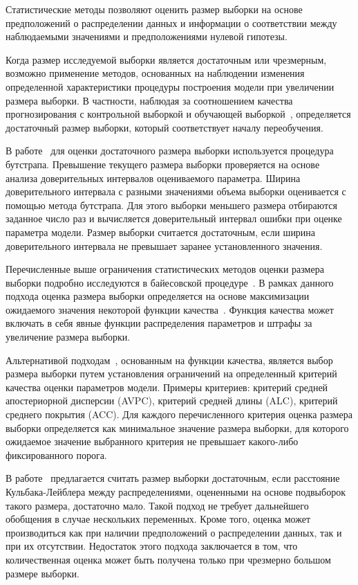 Статистические методы позволяют оценить размер выборки на основе предположений о распределении данных и информации о соответствии между наблюдаемыми значениями и предположениями нулевой гипотезы.

Когда размер исследуемой выборки является достаточным или чрезмерным, возможно применение методов, основанных на наблюдении изменения определенной характеристики процедуры построения модели при увеличении размера выборки. В частности, наблюдая за соотношением качества прогнозирования с контрольной выборкой и обучающей выборкой~\cite{motrenko2014}, определяется достаточный размер выборки, который соответствует началу переобучения.

В работе~\cite{qumsiyeh2013} для оценки достаточного размера выборки используется процедура бутстрапа. Превышение текущего размера выборки проверяется на основе анализа доверительных интервалов оцениваемого параметра. Ширина доверительного интервала с разными значениями объема выборки оценивается с помощью метода бутстрапа. Для этого выборки меньшего размера отбираются заданное число раз и вычисляется доверительный интервал ошибки при оценке параметра модели. Размер выборки считается достаточным, если ширина доверительного интервала не превышает заранее установленного значения.

Перечисленные выше ограничения статистических методов оценки размера выборки подробно исследуются в байесовской процедуре~\cite{lindley1997,rubin1998,wang2002}. В рамках данного подхода оценка размера выборки определяется на основе максимизации ожидаемого значения некоторой функции качества~\cite{lindley1997}. Функция качества может включать в себя явные функции распределения параметров и штрафы за увеличение размера выборки.

Альтернативой подходам~\cite{wang2002}, основанным на функции качества, является выбор размера выборки путем установления ограничений на определенный критерий качества оценки параметров модели. Примеры критериев: критерий средней апостериорной дисперсии (AVPC), критерий средней длины (ALC), критерий среднего покрытия (ACC). Для каждого перечисленного критерия оценка размера выборки определяется как минимальное значение размера выборки, для которого ожидаемое значение выбранного критерия не превышает какого-либо фиксированного порога.

В работе~\cite{motrenko2014} предлагается считать размер выборки достаточным, если расстояние Кульбака-Лейблера между распределениями, оцененными на основе подвыборок такого размера, достаточно мало. Такой подход не требует дальнейшего обобщения в случае нескольких переменных. Кроме того, оценка может производиться как при наличии предположений о распределении данных, так и при их отсутствии. Недостаток этого подхода заключается в том, что количественная оценка может быть получена только при чрезмерно большом размере выборки.

